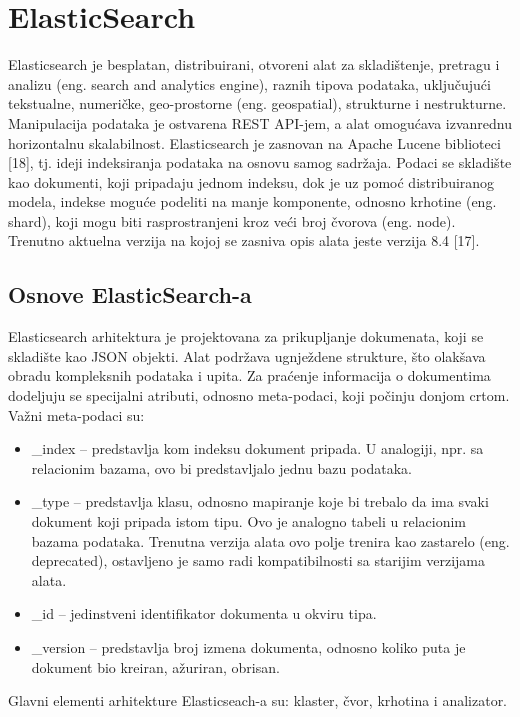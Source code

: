 \section{ElasticSearch}
Elasticsearch je besplatan, distribuirani, otvoreni alat za skladištenje, pretragu i analizu (eng. search and analytics engine), raznih tipova podataka, uključujući tekstualne, numeričke, geo-prostorne (eng. geospatial), strukturne i nestrukturne. Manipulacija podataka je ostvarena REST API-jem, a alat omogućava izvanrednu horizontalnu skalabilnost. Elasticsearch je zasnovan na Apache Lucene biblioteci [18], tj. ideji indeksiranja podataka na osnovu samog sadržaja. Podaci se skladište kao dokumenti, koji pripadaju jednom indeksu, dok je uz pomoć distribuiranog modela, indekse moguće podeliti na manje komponente, odnosno krhotine (eng. shard), koji mogu biti rasprostranjeni kroz veći broj čvorova (eng. node). Trenutno aktuelna verzija na kojoj se zasniva opis alata jeste verzija 8.4 [17].

\subsection{Osnove ElasticSearch-a}
Elasticsearch arhitektura je projektovana za prikupljanje dokumenata, koji se skladište kao JSON objekti. Alat podržava ugnježdene strukture, što olakšava obradu kompleksnih podataka i upita. Za praćenje informacija o dokumentima dodeljuju se specijalni atributi, odnosno meta-podaci, koji počinju donjom crtom. Važni meta-podaci su:
\begin{itemize}
    \item \_index – predstavlja kom indeksu dokument pripada. U analogiji, npr. sa relacionim bazama, ovo bi predstavljalo jednu bazu podataka.
    \item \_type – predstavlja klasu, odnosno mapiranje koje bi trebalo da ima svaki dokument koji pripada istom tipu. Ovo je analogno tabeli u relacionim bazama podataka. Trenutna verzija alata ovo polje trenira kao zastarelo (eng. deprecated), ostavljeno je samo radi kompatibilnosti sa starijim verzijama alata.
    \item \_id – jedinstveni identifikator dokumenta u okviru tipa.
    \item \_version – predstavlja broj izmena dokumenta, odnosno koliko puta je dokument bio kreiran, ažuriran, obrisan.
\end{itemize}

\par
Glavni elementi arhitekture Elasticseach-a su: klaster, čvor, krhotina i analizator.

